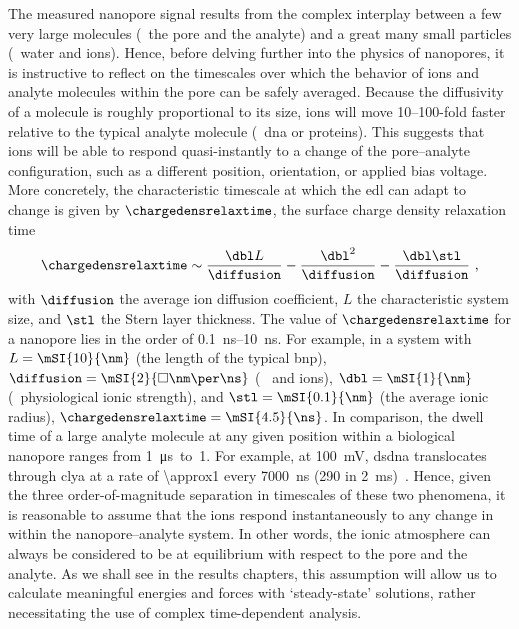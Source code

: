 The measured nanopore signal results from the complex interplay between a few very large molecules (\ie~the
pore and the analyte) and a great many small particles (\ie~water and ions). Hence, before delving further
into the physics of nanopores, it is instructive to reflect on the timescales over which the behavior of ions
and analyte molecules within the pore can be safely averaged. Because the diffusivity of a molecule is roughly
proportional to its size, ions will move \numrange{10}{100}-fold faster relative to the typical analyte
molecule (\ie~\gls{dna} or proteins). This suggests that ions will be able to respond quasi-instantly to a
change of the pore--analyte configuration, such as a different position, orientation, or applied bias voltage.
More concretely, the characteristic timescale at which the \gls{edl} can adapt to change is given by
$\chargedensrelaxtime$, the surface charge density relaxation time~\cite{Bazant-2004}
%
\begin{equation}\label{eq:nanopores_relaxation_time}
  \chargedensrelaxtime \sim \dfrac{\dbl L}{\diffusion} 
                            - \dfrac{\dbl^2}{\diffusion}
                            - \dfrac{\dbl \stl}{\diffusion}
  \text{ ,}
\end{equation}
%
with $\diffusion$ the average ion diffusion coefficient, $L$ the characteristic system size, and $\stl$ the
Stern layer thickness. The value of $\chargedensrelaxtime$ for a nanopore lies in the order of
\SIrange{0.1}{10}{\ns}. For example, in a system with $L = \mSI{10}{\nm}$ (the length of the typical
\gls{bnp}), $\diffusion = \mSI{2}{\square\nm\per\ns}$ (\eg~ and  ions), $\dbl = \mSI{1}{\nm}$
(\ie~physiological ionic strength), and $\stl = \mSI{0.1}{\nm}$ (the average ionic radius),
$\chargedensrelaxtime = \mSI{4.5}{\ns}$. In comparison, the dwell time of a large analyte molecule at any
given position within a biological nanopore ranges from \SI{1}{\us}~to~{1}{\second}. For example, at
\SI{+100}{\mV}, \gls{dsdna} translocates through \gls{clya} at a rate of \SI{\approx1}{\bp} every
\SI{7000}{\ns} (\SI{290}{\bp} in \SI{2}{\ms})~\cite{Franceschini-2013}. Hence, given the three
order-of-magnitude separation in timescales of these two phenomena, it is reasonable to assume that the ions
respond instantaneously to any change in within the nanopore--analyte system. In other words, the ionic
atmosphere can always be considered to be at equilibrium with respect to the pore and the analyte. As we shall
see in the results chapters, this assumption will allow us to calculate meaningful energies and forces with
`steady-state' solutions, rather necessitating the use of complex time-dependent analysis.



